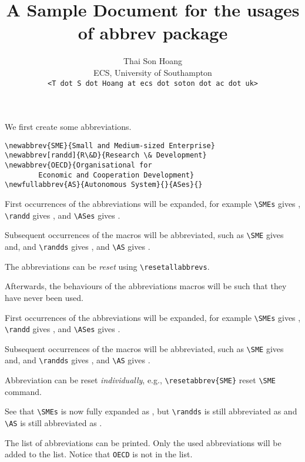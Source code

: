 \usepackage{verbatim}
\title{A Sample Document for the usages of \textsf{abbrev} package}
\author{Thai Son Hoang\\ECS, University of Southampton\\\texttt{<T dot S dot Hoang at ecs dot soton dot ac dot uk>}}


\maketitle

We first create some abbreviations.
\begin{verbatim}
\newabbrev{SME}{Small and Medium-sized Enterprise}
\newabbrev[randd]{R\&D}{Research \& Development}
\newabbrev{OECD}{Organisational for 
        Economic and Cooperation Development}
\newfullabbrev{AS}{Autonomous System}{}{ASes}{}
\end{verbatim}


First occurrences of the abbreviations will be expanded, for example \verb|\SMEs| gives \SMEs, \verb|\randd| gives \randd, and \verb|\ASes| gives \ASes.

Subsequent occurrences of the macros will be abbreviated, such as \verb|\SME| gives \SME and, and \verb|\randds| gives \randds, and \verb|\AS| gives \AS.

The abbreviations can be \emph{reset} using \verb|\resetallabbrevs|.
\resetallabbrevs

Afterwards, the behaviours of the abbreviations macros will be such that they have never been used.

First occurrences of the abbreviations will be expanded, for example \verb|\SMEs| gives \SMEs, \verb|\randd| gives \randd, and \verb|\ASes| gives \ASes.

Subsequent occurrences of the macros will be abbreviated, such as \verb|\SME| gives \SME and, and \verb|\randds| gives \randds, and \verb|\AS| gives \AS.
 
Abbreviation can be reset \emph{individually}, e.g., \verb|\resetabbrev{SME}| reset \verb|\SME| command.

See that \verb|\SMEs| is now fully expanded as \SMEs, but \verb|\randds| is still abbreviated as \randds and \verb|\AS| is still abbreviated as \AS.

The list of abbreviations can be printed.  Only the used abbreviations will be added to the list. Notice that \verb|OECD| is not in the list.

\printnomenclature



